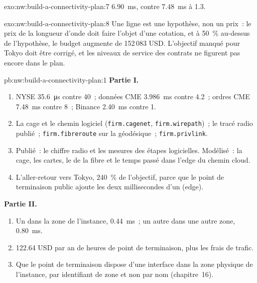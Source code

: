 \begin{solution}{exo:nw:build-a-connectivity-plan:7}
\qty{6.90}{\milli\second}, contre \qty{7.48}{\milli\second} à 1.3.
\end{solution}

\begin{solution}{exo:nw:build-a-connectivity-plan:8}
Une ligne est une hypothèse, non un prix~: le prix de la longueur d'onde doit faire l'objet d'une cotation, et à 50~\% au-dessus de l'hypothèse, le budget augmente de 152\,083 USD.
L'objectif manqué pour Tokyo doit être corrigé, et les niveaux de service des contrats ne figurent pas encore dans le plan.
\end{solution}

\begin{solution}{pb:nw:build-a-connectivity-plan:1}
\textbf{Partie I.}
\begin{enumerate} \sloppy
\item NYSE \qty{35.6}{\micro\second} contre 40~; données CME \qty{3.986}{\milli\second} contre 4.2~; ordres CME \qty{7.48}{\milli\second}
  contre 8~; Binance \qty{2.40}{\milli\second} contre 1.
\item La cage et le chemin logiciel (\texttt{firm.cagenet}, \texttt{firm.wirepath})~; le tracé radio publié~; \texttt{firm.fibreroute} sur
  la géodésique~; \texttt{firm.privlink}.
\item Publié~: le chiffre radio et les mesures des étapes logicielles. Modélisé~: la cage, les cartes, le  de la fibre et le
  temps passé dans l'edge du chemin cloud.
\item L'aller-retour vers Tokyo, 240~\% de l'objectif, parce que le point de terminaison public ajoute les deux millisecondes d'un  (edge).
\end{enumerate}
\textbf{Partie II.}
\begin{enumerate}[resume]
\item Un  dans la zone de l'instance, \qty{0.44}{\milli\second}~; un autre dans une autre zone, \qty{0.80}{\milli\second}.
\item 122.64 USD par an de heures de point de terminaison, plus les frais de trafic.
\item Que le point de terminaison dispose d'une interface dans la zone physique de l'instance, par identifiant de zone et non par nom (chapitre~16).

\end{enumerate}
\end{solution}

